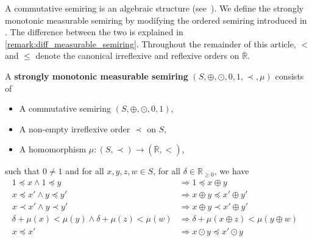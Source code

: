 A commutative semiring is an algebraic structure (see~\cite[Definition 4]{bruggink2015proving}\cite[Definition 2.5]{endrullis2024generalized}). 
We define the strongly monotonic measurable semiring by modifying the ordered semiring introduced in \cite[Definition 2.6]{endrullis2024generalized}. The difference between the two is explained in \autoref{remark:diff_measurable_semiring}.
Throughout the remainder of this article, $<$ and $\leq$ denote the canonical irreflexive and reflexive orders on $\overline{\mathbb{R}}$.
\begin{definition}
    \label{def:real_strongly_monotonic_semiring}
    A \textbf{strongly monotonic measurable semiring} $(S, \oplus, \odot, 0, 1, \prec, \mu)$ consists of
    \begin{itemize}
        \item A commutative semiring $(S, \oplus, \odot, 0, 1)$,
        \item A non-empty irreflexive order $\prec$ on $S$,
        \item A homomorphism $\mu : (S, \prec) \to ( \overline{\mathbb{R}}, < )$,
    \end{itemize}
    such that $0 \neq 1$ and for all $x,y,z,w \in S$, for all $\delta \in \mathbb{R}_{\geq 0}$, we have
        \begin{align*}
            1 \preceq x \land 1 \preceq y 
            &\Rightarrow
            1 \preceq x \oplus y
            &\tag{S0} \label{ax:s0} 
            \\ 
            x \preceq x' \land y \preceq y' 
            &\Rightarrow
            x \oplus y \preceq x' \oplus y'
            &\tag{S1} \label{ax:s1} 
            \\   
            x \prec x' \land y \prec y'  
            &\Rightarrow
            x \oplus y \prec x' \oplus y'
            &\tag{S2} \label{ax:s2} 
            \\
            \delta + \mu(x) < \mu(y) \land \delta + \mu(z) < \mu(w)
            &\Rightarrow
            \delta + \mu(x \oplus z) < \mu(y \oplus w)
            &\tag{S3} \label{ax:s2'}
            \\
            x \preceq x'
            &\Rightarrow 
            x \odot y \preceq x' \odot y 
            &\tag{S4} \label{ax:s3} 
            \\

\end{align*}
\end{definition}
